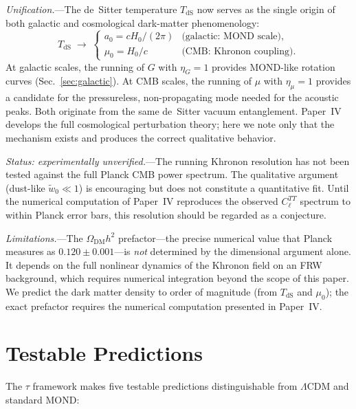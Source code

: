 \documentclass[prd,twocolumn,superscriptaddress,longbibliography,floatfix]{revtex4-2}
\newcommand{\tauasym}{\tau}
\begin{document}
\emph{Unification.}---The de~Sitter temperature
$T_{\mathrm{dS}}$ now serves as the single origin of both
galactic and cosmological dark-matter phenomenology:
\begin{equation}
T_{\mathrm{dS}} \;\longrightarrow\;
\begin{cases}
a_0 = cH_0/(2\pi) & \text{(galactic: MOND scale)}, \\
\mu_0 = H_0/c & \text{(CMB: Khronon coupling)}.
\end{cases}
\label{eq:unification}
\end{equation}
At galactic scales, the running of $G$ with $\eta_G = 1$
provides MOND-like rotation curves
(Sec.~\ref{sec:galactic}).  At CMB scales, the running of
$\mu$ with $\eta_\mu = 1$ provides a candidate for the
pressureless, non-propagating mode needed for the acoustic
peaks.  Both originate from the same de~Sitter vacuum
entanglement.
Paper~IV~\cite{Paper4} develops the full cosmological
perturbation theory; here we note only that the mechanism
exists and produces the correct qualitative behavior.

\emph{Status: experimentally unverified.}---The running
Khronon resolution has not been tested against the full Planck
CMB power spectrum.  The qualitative argument (dust-like
$\tilde{w}_0 \ll 1$) is encouraging but does not constitute a
quantitative fit.  Until the numerical computation of
Paper~IV reproduces the observed $C_\ell^{TT}$ spectrum to
within Planck error bars, this resolution should be regarded
as a conjecture.

\emph{Limitations.}---The $\Omega_{\mathrm{DM}} h^2$
prefactor---the precise numerical value that Planck measures
as $0.120 \pm 0.001$---is \emph{not} determined by the
dimensional argument alone.  It depends on the full
nonlinear dynamics of the Khronon field on an FRW background,
which requires numerical integration beyond the scope of this
paper.  We predict the dark matter density to order of
magnitude (from $T_{\mathrm{dS}}$ and $\mu_0$); the exact
prefactor requires the numerical computation presented in
Paper~IV.

\section{Testable Predictions}
\label{sec:predictions}

The $\tauasym$ framework makes five testable predictions
distinguishable from $\Lambda$CDM and standard MOND:
\end{document}
